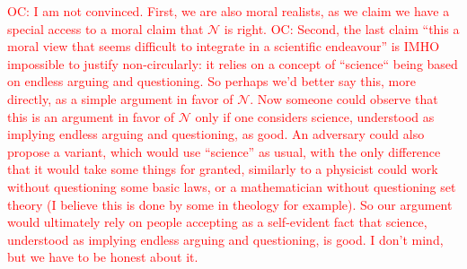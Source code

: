 \documentclass[preprint, french, english, 11pt, authoryear]{elsarticle}%
\newcommand{\commentOC}[1]{\textcolor{red}{OC: #1}}
\newcommand{\adv}{\mathscr{N}}
\begin{document}
\commentOC{I am not convinced. First, we are also moral realists, as we claim we have a special access to a moral claim that $\adv$ is right.}
\commentOC{ Second, the last claim “this a moral view that seems difficult to integrate in a scientific endeavour” is IMHO impossible to justify non-circularly: it relies on a concept of “science“ being based on endless arguing and questioning. So perhaps we’d better say this, more directly, as a simple argument in favor of $\adv$. Now someone could observe that this is an argument in favor of $\adv$ only if one considers science, understood as implying endless arguing and questioning, as good. An adversary could also propose a variant, which would use “science” as usual, with the only difference that it would take some things for granted, similarly to a physicist could work without questioning some basic laws, or a mathematician without questioning set theory (I believe this is done by some in theology for example). So our argument would ultimately rely on people accepting as a self-evident fact that science, understood as implying endless arguing and questioning, is good. I don’t mind, but we have to be honest about it.}
\end{document}
